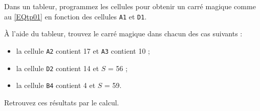 \begin{TP}
\item Dans un tableur, programmez les cellules pour obtenir un carré magique comme au \ref{EQtp01} en fonction des cellules \texttt{A1} et \texttt{D1}.
\item À l'aide du tableur, trouvez le carré magique dans chacun des cas suivants :
\begin{itemize}
    \item la cellule \texttt{A2} contient 17 et \texttt{A3} contient 10 ;
    \item la cellule \texttt{D2} contient 14  et $S$ = 56 ;
    \item la cellule \texttt{B4} contient 4 et $S$ = 59.
\end{itemize}

\item Retrouvez ces résultats par le calcul.

\end{TP}

 





